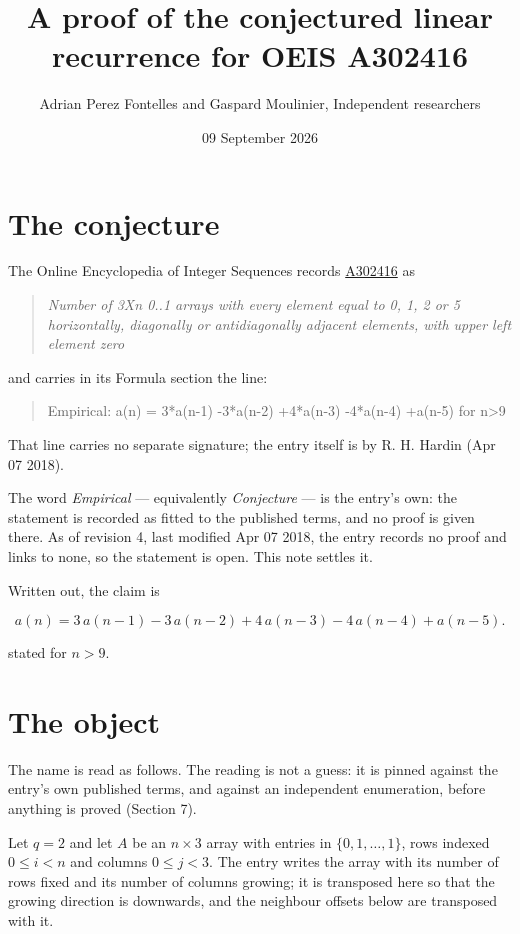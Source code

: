 \documentclass[11pt]{article}
\title{A proof of the conjectured linear recurrence for OEIS A302416}
\author{Adrian Perez Fontelles and Gaspard Moulinier, Independent researchers}
\date{09 September 2026}
\theoremstyle{definition}
\begin{document}
\maketitle
\section{The conjecture}

The Online Encyclopedia of Integer Sequences records \href{https://oeis.org/A302416}{A302416} as

\begin{quote}\itshape Number of 3Xn 0..1 arrays with every element equal to 0, 1, 2 or 5 horizontally, diagonally or antidiagonally adjacent elements, with upper left element zero\end{quote}

and carries in its Formula section the line:

\begin{quote}\ttfamily Empirical: a(n) = 3*a(n-1) -3*a(n-2) +4*a(n-3) -4*a(n-4) +a(n-5) for n>9\end{quote}

That line carries no separate signature; the entry itself is by R. H. Hardin (Apr 07 2018).

The word {\itshape Empirical} --- equivalently {\itshape Conjecture} --- is the entry's own: the statement is recorded as fitted to the published terms, and no proof is given there. As of revision 4, last modified Apr 07 2018, the entry records no proof and links to none, so the statement is open. This note settles it.

Written out, the claim is

\[a(n) = 3\,a(n-1) - 3\,a(n-2) + 4\,a(n-3) - 4\,a(n-4) + a(n-5).\]

stated for $n > 9$.

\section{The object}

The name is read as follows. The reading is not a guess: it is pinned against the entry's own published terms, and against an independent enumeration, before anything is proved (Section 7).

Let $q = 2$ and let $A$ be an $n \times 3$ array with entries in $\{0,1,\dots,1\}$, rows indexed $0 \le i < n$ and columns $0 \le j < 3$. The entry writes the array with its number of rows fixed and its number of columns growing; it is transposed here so that the growing direction is downwards, and the neighbour offsets below are transposed with it.
\end{document}
